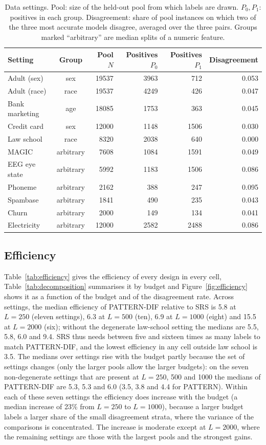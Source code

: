 \documentclass[pdflatex,sn-mathphys-num,iicol]{sn-jnl}
\theoremstyle{thmstyleone}
\theoremstyle{thmstyletwo}
\theoremstyle{thmstylethree}
\begin{document}
\begin{table}[t]\centering\footnotesize
\caption{Data settings. Pool: size of the held-out pool from which labels are drawn. $P_0,P_1$: positives in each group. Disagreement: share of pool instances on which two of the three most accurate models disagree, averaged over the three pairs. Groups marked ``arbitrary'' are median splits of a numeric feature.}\label{tab:data}
\begin{tabular}{lcrrrr}\toprule
Setting & Group & Pool $N$ & Positives $P_0$ & Positives $P_1$ & Disagreement \\\midrule
Adult (sex) & sex & 19537 & 3963 & 712 & 0.053 \\
Adult (race) & race & 19537 & 4249 & 426 & 0.047 \\
Bank marketing & age & 18085 & 1753 & 363 & 0.045 \\
Credit card & sex & 12000 & 1148 & 1506 & 0.030 \\
Law school & race & 8320 & 2038 & 640 & 0.000 \\
MAGIC & arbitrary & 7608 & 1084 & 1591 & 0.049 \\
EEG eye state & arbitrary & 5992 & 1183 & 1506 & 0.086 \\
Phoneme & arbitrary & 2162 & 388 & 247 & 0.095 \\
Spambase & arbitrary & 1841 & 490 & 235 & 0.043 \\
Churn & arbitrary & 2000 & 149 & 134 & 0.041 \\
Electricity & arbitrary & 12000 & 2582 & 2488 & 0.086 \\
\bottomrule\end{tabular}
\end{table}

\subsection{Efficiency}
Table~\ref{tab:efficiency} gives the efficiency of every design in every cell, Table~\ref{tab:decomposition} summarises it by budget and Figure~\ref{fig:efficiency} shows it as a function of the budget and of the disagreement rate. Across settings, the median efficiency of PATTERN-DIF relative to SRS is 5.8 at $L=250$ (eleven settings), 6.3 at $L=500$ (ten), 6.9 at $L=1000$ (eight) and 15.5 at $L=2000$ (six); without the degenerate law-school setting the medians are 5.5, 5.8, 6.0 and 9.4. SRS thus needs between five and sixteen times as many labels to match PATTERN-DIF, and the lowest efficiency in any cell outside law school is 3.5. The medians over settings rise with the budget partly because the set of settings changes (only the larger pools allow the larger budgets): on the seven non-degenerate settings that are present at $L=250$, 500 and 1000 the medians of PATTERN-DIF are 5.3, 5.3 and 6.0 (3.5, 3.8 and 4.4 for PATTERN). Within each of these seven settings the efficiency does increase with the budget (a median increase of 23\% from $L=250$ to $L=1000$), because a larger budget labels a larger share of the small disagreement strata, where the variance of the comparisons is concentrated. The increase is moderate except at $L=2000$, where the remaining settings are those with the largest pools and the strongest gains.
\end{document}
